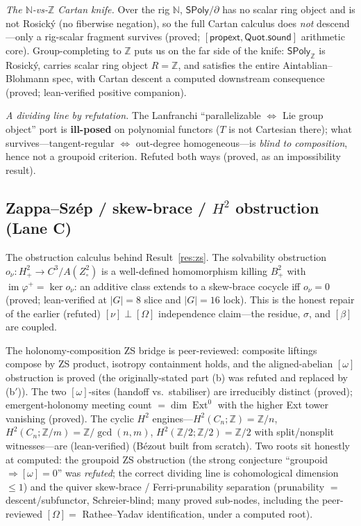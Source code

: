 \documentclass[11pt]{article}
\theoremstyle{definition}
\newcommand{\SPoly}{\mathsf{SPoly}}
\newcommand{\N}{\mathbb{N}}
\newcommand{\Z}{\mathbb{Z}}
\newcommand{\onu}{o_{\nu}}
\newcommand{\grade}[1]{{\small\textsf{(#1)}}}
\begin{document}
\emph{The $\N$-vs-$\Z$ Cartan knife.} Over the rig $\N$, $\SPoly/\partial$ has no scalar ring
object and is not Rosický (no fiberwise negation), so the full Cartan calculus does \emph{not}
descend---only a rig-scalar fragment survives \grade{proved; $[\textsf{propext},\textsf{Quot.sound}]$
arithmetic core}. Group-completing to $\Z$ puts us on the far side of the knife: $\SPoly_\Z$ is
Rosický, carries scalar ring object $R=\Z$, and satisfies the entire Aintablian--Blohmann spec,
with Cartan descent a \textsf{computed} downstream consequence \grade{proved; lean-verified positive companion}.

\emph{A dividing line by refutation.} The Lanfranchi ``parallelizable $\Leftrightarrow$ Lie group
object'' port is \textbf{ill-posed} on polynomial functors ($T$ is not Cartesian there); what
survives---tangent-regular $\Leftrightarrow$ out-degree homogeneous---is \emph{blind to
composition}, hence not a groupoid criterion. Refuted both ways \grade{proved, as an impossibility result}.

\subsection{Zappa--Szép / skew-brace / $H^2$ obstruction (Lane C)}

The obstruction calculus behind Result~\ref{res:zs}. The solvability obstruction
$\onu\colon H^2_+ \to C^3/A(Z^2_\circ)$ is a well-defined homomorphism killing $B^2_+$ with
$\operatorname{im}\varphi^+ = \ker\onu$: an additive class extends to a skew-brace cocycle iff
$\onu = 0$ \grade{proved; lean-verified at $|G|=8$ slice and $|G|=16$ lock}. This is the honest
repair of the earlier (refuted) $[\nu]\perp[\Omega]$ independence claim---the residue, $\sigma$,
and $[\beta]$ are coupled.

The holonomy-composition ZS bridge is \textsf{peer-reviewed}: composite liftings compose by ZS
product, isotropy containment holds, and the aligned-abelian $[\omega]$ obstruction is proved
(the originally-stated part (b) was refuted and replaced by (b$'$)). The two $[\omega]$-sites
(handoff vs.\ stabiliser) are irreducibly distinct \grade{proved}; emergent-holonomy meeting
count $= \dim\operatorname{Ext}^0$ with the higher Ext tower vanishing \grade{proved}. The
cyclic $H^2$ engines---$H^2(C_n;\Z) = \Z/n$, $H^2(C_n;\Z/m) = \Z/\gcd(n,m)$,
$H^2(\Z/2;\Z/2) = \Z/2$ with split/nonsplit witnesses---are \grade{lean-verified} (Bézout built
from scratch). Two roots sit honestly at \textsf{computed}: the groupoid ZS obstruction (the
strong conjecture ``groupoid $\Rightarrow [\omega]=0$'' was \emph{refuted}; the correct dividing
line is cohomological dimension $\le 1$) and the quiver skew-brace / Ferri-prunability
separation (prunability $=$ descent/subfunctor, Schreier-blind; many \textsf{proved} sub-nodes,
including the \textsf{peer-reviewed} $[\Omega] =$ Rathee--Yadav identification, under a
\textsf{computed} root).
\end{document}
